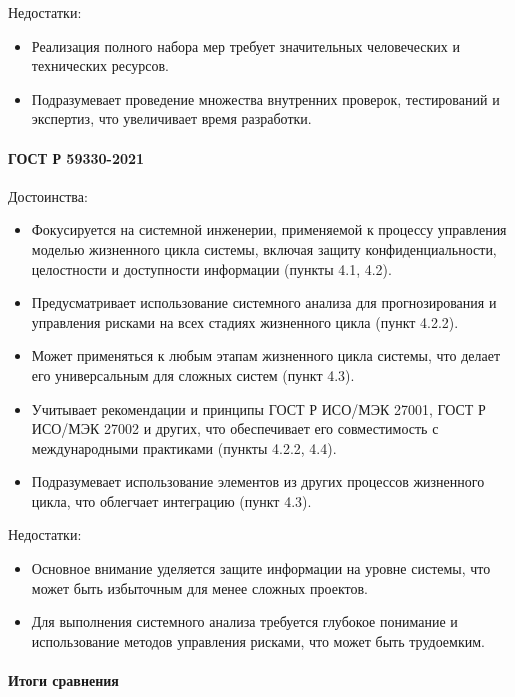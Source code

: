Недостатки:

\begin{itemize}
	\item Реализация полного набора мер требует значительных человеческих
		и технических ресурсов.
	\item Подразумевает проведение множества внутренних проверок,
		тестирований и экспертиз, что увеличивает время разработки.
\end{itemize}

\paragraph{ГОСТ Р 59330-2021}

Достоинства:

\begin{itemize}
	\item Фокусируется на системной инженерии,
		применяемой к процессу управления моделью жизненного цикла системы,
		включая защиту конфиденциальности,
		целостности и доступности информации (пункты 4.1, 4.2).
	\item Предусматривает использование системного анализа для прогнозирования
		и управления рисками на всех стадиях жизненного цикла (пункт 4.2.2).
	\item Может применяться к любым этапам жизненного цикла системы,
		что делает его универсальным для сложных систем (пункт 4.3).
	\item Учитывает рекомендации и принципы ГОСТ Р ИСО/МЭК 27001,
		ГОСТ Р ИСО/МЭК 27002 и других,
		что обеспечивает его совместимость
		с международными практиками (пункты 4.2.2, 4.4).
	\item Подразумевает использование элементов
		из других процессов жизненного цикла,
		что облегчает интеграцию (пункт 4.3).
\end{itemize}

Недостатки:

\begin{itemize}
	\item Основное внимание уделяется защите информации на уровне системы,
		что может быть избыточным для менее сложных проектов.
	\item Для выполнения системного анализа требуется глубокое понимание
		и использование методов управления рисками, что может быть трудоемким.
\end{itemize}

\paragraph{Итоги сравнения}

